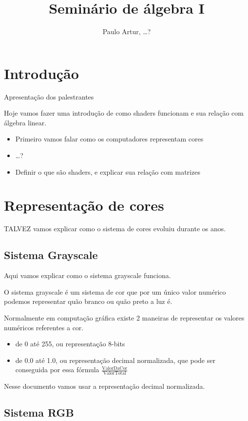 \documentclass{article}
\title{Seminário de álgebra I}
\author{Paulo Artur, \ldots?}
\begin{document}
\maketitle

\section*{Introdução}

Apresentação dos palestrantes

Hoje vamos fazer uma introdução de como shaders funcionam e sua relação com álgebra linear.

\begin{itemize}
\item Primeiro vamos falar como os computadores representam cores
\item \ldots?
\item Definir o que são shaders, e explicar sua relação com matrizes
\end{itemize}

\section*{Representação de cores}

TALVEZ vamos explicar como o sistema de cores evoluiu durante os anos.

\subsection*{Sistema Grayscale}

Aqui vamos explicar como o sistema grayscale funciona.

O sistema grayscale é um sistema de cor que por um único valor numérico podemos representar quão branco ou quão preto a luz é.

Normalmente em computação gráfica existe 2 maneiras de representar os valores numéricos referentes a cor.

\begin{itemize}
\item de 0 até 255, ou representação 8-bits
\item de 0.0 até 1.0, ou representação decimal normalizada, que pode ser conseguida por essa fórmula $\frac{\text{ValorDaCor}}{\text{ValorTotal}}$
\end{itemize}


Nesse documento vamos usar a representação decimal normalizada.

\subsection*{Sistema RGB}
\end{document}
